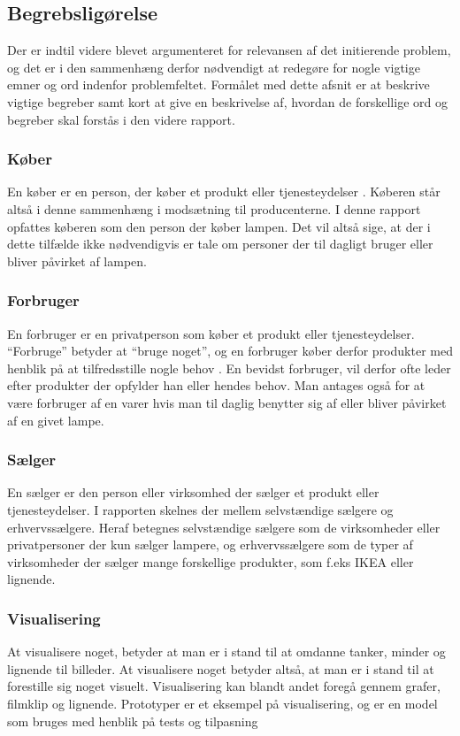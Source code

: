 \subsection{Begrebsligørelse}

Der er indtil videre blevet  argumenteret for relevansen af det initierende problem, og det er i den sammenhæng derfor nødvendigt at redegøre for nogle vigtige emner og ord indenfor problemfeltet. Formålet med dette afsnit er at beskrive vigtige begreber samt kort at give en beskrivelse af, hvordan de forskellige ord og begreber skal forstås i den videre rapport.

\subsubsection{Køber}
En køber er en person, der køber et produkt eller tjenesteydelser \cite{ddo_forbruger}.  Køberen står altså i denne sammenhæng i modsætning til producenterne.
I denne rapport opfattes køberen som den person der køber lampen. Det vil altså sige, at der i dette tilfælde ikke nødvendigvis er tale om personer der til dagligt bruger eller bliver påvirket af lampen.

\subsubsection{Forbruger}
En forbruger er en privatperson som køber et produkt eller tjenesteydelser. “Forbruge” betyder at “bruge noget”, og en forbruger køber derfor produkter med henblik på at tilfredsstille nogle behov \cite{forbrugerportalen}. En bevidst forbruger, vil derfor ofte leder efter produkter der opfylder han eller hendes behov. Man antages også for at være forbruger af en varer hvis man til daglig benytter sig af eller bliver påvirket af en givet  lampe.

\subsubsection{Sælger}
En sælger er den person eller virksomhed der sælger et produkt eller tjenesteydelser. I rapporten skelnes der mellem selvstændige sælgere og erhvervssælgere. Heraf betegnes selvstændige sælgere som de virksomheder eller privatpersoner der kun sælger lampere, og erhvervssælgere som de typer af virksomheder der sælger mange forskellige produkter, som f.eks IKEA eller lignende. 

\subsubsection{Visualisering}
At visualisere noget, betyder at man er i stand til at omdanne tanker, minder og lignende til billeder. At visualisere noget betyder altså, at man er i stand til at forestille sig noget visuelt. Visualisering kan blandt andet foregå gennem grafer, filmklip og lignende.  
Prototyper er et eksempel på visualisering, og er en model som bruges med henblik på tests og tilpasning

